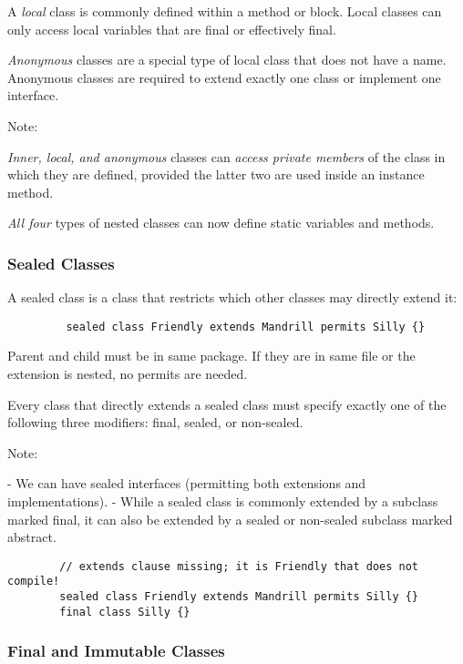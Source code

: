 \documentclass{scrartcl}
\begin{document}
    A \textit{local} class is commonly defined within a method or block.
    Local classes can only access local variables that are final or effectively final.

    \textit{Anonymous} classes are a special type of local class that does not have a name.
    Anonymous classes are required to extend exactly one class or implement one interface.

    Note:

    \textit{Inner, local, and anonymous} classes can \textit{access private members} of the class in which they are defined, provided the latter two are used inside an instance method.

    \textit{All four} types of nested classes can now define static variables and methods.

\subsubsection{Sealed Classes}

    A sealed class is a class that restricts which other classes may directly extend it:

    \begin{lstlisting}
         sealed class Friendly extends Mandrill permits Silly {}
    \end{lstlisting}

    Parent and child must be in same package. If they are in same file or the extension is nested, no permits are needed.

    Every class that directly extends a sealed class must specify exactly one of the following three modifiers: final, sealed, or non-­sealed.

    Note:

    - We can have sealed interfaces (permitting both extensions and implementations).
    - While a sealed class is commonly extended by a subclass marked final, it can also be extended by a sealed or non-­sealed subclass marked abstract.

    \begin{lstlisting}
        // extends clause missing; it is Friendly that does not compile!
        sealed class Friendly extends Mandrill permits Silly {}
        final class Silly {}
    \end{lstlisting}
\subsubsection{Final and Immutable Classes}
\end{document}
